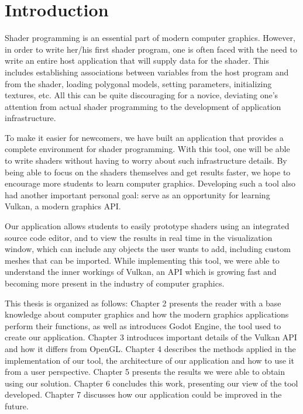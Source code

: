 \chapter{Introduction}

Shader programming is an essential part of modern computer graphics. However, in order to write her/his first shader program, one is often faced with the need to write an entire host application that will supply data for the shader. This includes establishing associations between variables from the host program and from the shader, loading polygonal models, setting parameters, initializing textures, etc.  
All this can be quite discouraging for a novice, deviating one's attention from actual shader programming to the development of application infrastructure.

To make it easier for newcomers, we have built an application that provides a complete environment for shader programming. With this tool, one will be able to write shaders without having to worry about such infrastructure details. By being able to focus on the shaders themselves and get results faster, we hope to encourage more students to learn computer graphics. Developing such a tool also had another important personal goal: serve as an opportunity for learning Vulkan, a modern graphics API.

Our application allows students to easily prototype shaders using an integrated source code editor, and to view the results in real time in the visualization window, which can include any objects the user wants to add, including custom meshes that can be imported. While implementing this tool, we were able to understand the inner workings of Vulkan, an API which is growing fast and becoming more present in the industry of computer graphics.

This thesis is organized as follows: Chapter 2 presents the reader with a base knowledge about computer graphics and how the modern graphics applications perform their functions, as well as introduces Godot Engine, the tool used to create our application. Chapter 3 introduces important details of the Vulkan API and how it differs from OpenGL. Chapter 4 describes the methods applied in the implementation of our tool, the architecture of our application and how to use it from a user perspective. Chapter 5 presents the results we were able to obtain using our solution. Chapter 6 concludes this work, presenting our view of the tool developed. Chapter 7 discusses how our application could be improved in the future.

